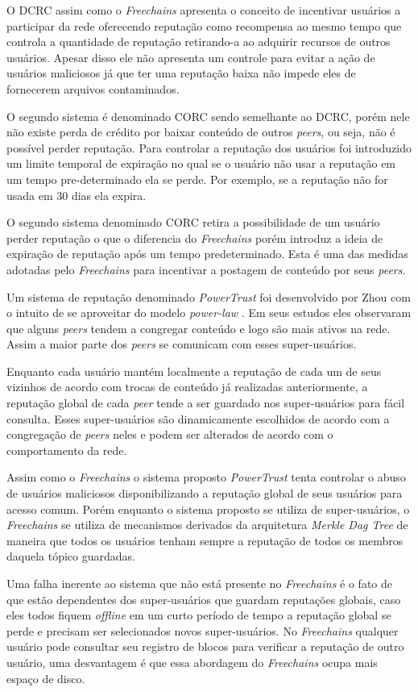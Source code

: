 \documentclass[12pt]{article}
\newcommand{\FC} {\emph{Freechains}\xspace}
\begin{document}
O DCRC assim como o \FC apresenta o conceito de incentivar usuários a participar da rede oferecendo reputação como recompensa ao mesmo tempo que controla a quantidade de reputação retirando-a ao adquirir recursos de outros usuários. Apesar disso ele não apresenta um controle para evitar a ação de usuários maliciosos já que ter uma reputação baixa não impede eles de fornecerem arquivos contaminados.

O segundo sistema é denominado CORC sendo semelhante ao DCRC, porém nele não existe perda de crédito por baixar conteúdo de outros \emph{peers}, ou seja, não é possível perder reputação. Para controlar a reputação dos usuários foi introduzido um limite temporal de expiração no qual se o usuário não usar a reputação em um tempo pre-determinado ela se perde. Por exemplo, se a reputação não for usada em 30 dias ela expira. 

O segundo sistema denominado CORC retira a possibilidade de um usuário perder reputação o que o diferencia do \FC porém introduz a ideia de expiração de reputação após um tempo predeterminado. Esta  é uma das medidas adotadas pelo \FC para incentivar a postagem de conteúdo por seus \emph{peers}.

Um sistema de reputação denominado \emph{PowerTrust} foi desenvolvido por Zhou com o intuito de se aproveitar do modelo \emph{power-law} \cite{zhou2007powertrust}. Em seus estudos eles observaram que alguns \emph{peers} tendem a congregar conteúdo e logo são mais ativos na rede. Assim a maior parte dos \emph{peers} se comunicam com esses super-usuários. 

Enquanto cada usuário mantém localmente a reputação de cada um de seus vizinhos de acordo com trocas de conteúdo já realizadas anteriormente, a reputação global de cada \emph{peer} tende a ser guardado nos super-usuários para fácil consulta. Esses super-usuários são dinamicamente escolhidos de acordo com a congregação de \emph{peers} neles e podem ser alterados de acordo com o comportamento da rede.

Assim como o \FC o sistema proposto \emph{PowerTrust} tenta controlar o abuso de usuários maliciosos disponibilizando a reputação global de seus usuários para acesso comum. Porém enquanto o sistema proposto se utiliza de super-usuários, o \FC se utiliza de mecanismos derivados da arquitetura \emph{Merkle Dag Tree} de maneira que todos os usuários tenham sempre a reputação de todos os membros daquela tópico guardadas. 

Uma falha inerente ao sistema que não está presente no \FC é o fato de que estão dependentes dos super-usuários que guardam reputações globais, caso eles todos fiquem \emph{offline} em um curto período de tempo a reputação global se perde e precisam ser selecionados novos super-usuários. No \FC qualquer usuário pode consultar seu registro de blocos para verificar a reputação de outro usuário, uma desvantagem é que essa abordagem do \FC ocupa mais espaço de disco.
\end{document}
